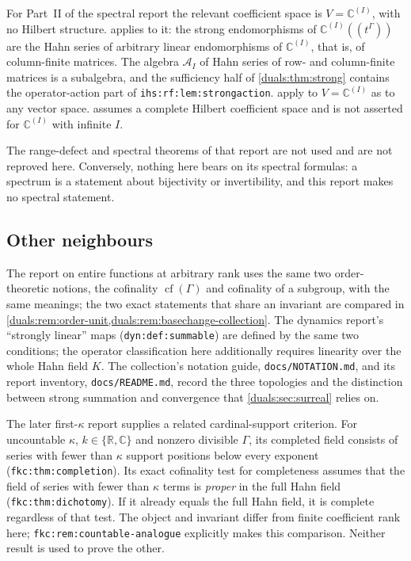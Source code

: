 \documentclass[11pt,letterpaper]{article}
\numberwithin{equation}{section}
\theoremstyle{definition}
\theoremstyle{remark}
\newcommand{\C}{\mathbb C}
\newcommand{\R}{\mathbb R}
\newcommand{\ihs}[1]{\texttt{ihs:#1}}
\newcommand{\lab}[1]{\texttt{#1}}
\begin{document}
For Part~II of the spectral report the relevant coefficient space is
$V=\C^{(I)}$, with no Hilbert structure.  applies
to it: the strong endomorphisms of $\C^{(I)}((t^\Gamma))$ are the Hahn
series of arbitrary linear endomorphisms of $\C^{(I)}$, that is, of
column-finite matrices. The algebra $\mathcal A_I$ of Hahn series of
row- and column-finite matrices is a subalgebra, and the
sufficiency half of \cref{duals:thm:strong} contains the operator-action
part of \ihs{rf:lem:strongaction}. 
apply to $V=\C^{(I)}$ as to any vector space. 
assumes a complete Hilbert coefficient space and is not asserted for
$\C^{(I)}$ with infinite $I$.

The range-defect and spectral theorems of that report are not used and
are not reproved here. Conversely, nothing here bears on its spectral
formulas: a spectrum is a statement about bijectivity or invertibility,
and this report makes no spectral statement.

\subsection{Other neighbours}
The report on entire functions at arbitrary rank uses the same two
order-theoretic notions, the cofinality $\operatorname{cf}(\Gamma)$ and
cofinality of a subgroup, with the same meanings; the two exact
statements that share an invariant are compared in
\cref{duals:rem:order-unit,duals:rem:basechange-collection}. The dynamics
report's ``strongly linear'' maps (\lab{dyn:def:summable}) are defined by
the same two conditions; the operator classification here additionally
requires linearity over the whole Hahn field $K$. The
collection's notation guide, \texttt{docs/NOTATION.md}, and its report
inventory, \texttt{docs/README.md}, record the three topologies and the
distinction between strong summation and convergence that
\cref{duals:sec:surreal} relies on.

The later first-$\kappa$ report \cite{RepoFirstKappa} supplies a related
cardinal-support criterion. For uncountable $\kappa$, $k\in\{\R,\C\}$
and nonzero divisible $\Gamma$, its completed field consists of series with
fewer than $\kappa$ support positions below every exponent
(\lab{fkc:thm:completion}). Its exact cofinality test for completeness
assumes that the field of series with fewer than $\kappa$ terms is
\emph{proper} in the full Hahn field (\lab{fkc:thm:dichotomy}). If it
already equals the full Hahn field, it is complete regardless of that
test. The object and invariant differ from finite coefficient rank here;
\lab{fkc:rem:countable-analogue} explicitly makes this comparison.
Neither result is used to prove the other.
\end{document}
